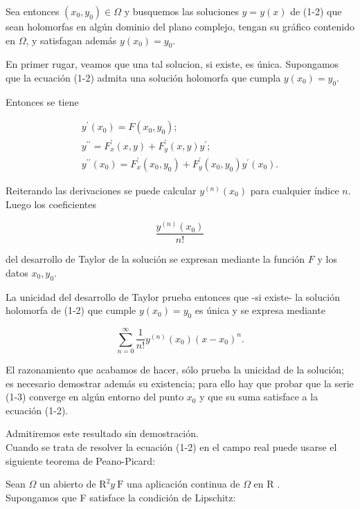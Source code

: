 \documentclass[10pt]{article}
\theoremstyle{plain}
\theoremstyle{definition}
\theoremstyle{remark}
\begin{document}
Sea entonces $\left(x_{0}, y_{0}\right) \in \Omega$ y busquemos las soluciones $y=y(x)$ de (1-2) que sean holomorfas en algún dominio del plano complejo, tengan su gráfico contenido en $\Omega$, y satisfagan además $y\left(x_{0}\right)=y_{0}$.

En primer rugar, veamos que una tal solucion, si existe, es única. Supongamos que la ecuación (1-2) admita una solución holomorfa que cumpla $y\left(x_{0}\right)=y_{0}$.

Entonces se tiene

$$
\begin{gathered}
y^{\prime}\left(x_{0}\right)=F\left(x_{0}, y_{0}\right) ; \\
y^{\prime \prime}=F_{x}^{\prime}(x, y)+F_{y}^{\prime}(x, y) y^{\prime} ; \\
y^{\prime \prime}\left(x_{0}\right)=F_{x}^{\prime}\left(x_{0}, y_{0}\right)+F_{y}^{\prime}\left(x_{0}, y_{0}\right) y^{\prime}\left(x_{0}\right) .
\end{gathered}
$$

Reiterando las derivaciones se puede calcular $y^{(n)}\left(x_{0}\right)$ para cualquier índice $n$. Luego los coeficientes

$$
\frac{y^{(n)}\left(x_{0}\right)}{n!}
$$

del desarrollo de Taylor de la solución se expresan mediante la función $F$ y los datos $x_{0}, y_{0}$.

La unicidad del desarrollo de Taylor prueba entonces que -si existe- la solución holomorfa de (1-2) que cumple $y\left(x_{0}\right)=y_{0}$ es única y se expresa mediante


\begin{equation*}
\sum_{n=0}^{\infty} \frac{1}{n!} y^{(n)}\left(x_{0}\right)\left(x-x_{0}\right)^{n} . \tag{1-3}
\end{equation*}


El razonamiento que acabamos de hacer, sólo prueba la unicidad de la solución; es necesario demostrar además su existencia; para ello hay que probar que la serie (1-3) converge en algún entorno del punto $x_{0}$ y que su suma satisface a la ecuación (1-2).

Admitiremos este resultado sin demostración.\\
Cuando se trata de resolver la ecuación (1-2) en el campo real puede usarse el siguiente teorema de Peano-Picard:

Sean $\Omega$ un abierto de $\mathrm{R}^{2} y \mathrm{~F}$ una aplicación continua de $\Omega$ en R .\\
Supongamos que F satisface la condición de Lipschitz:
\end{document}
